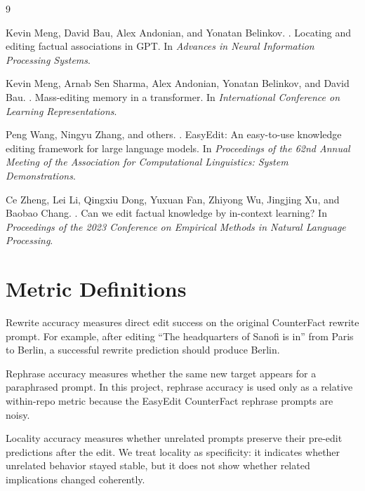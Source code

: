 \documentclass[11pt]{article}
\begin{document}
\begin{thebibliography}{9}

Kevin Meng, David Bau, Alex Andonian, and Yonatan Belinkov.
.
\newblock Locating and editing factual associations in GPT.
\newblock In \emph{Advances in Neural Information Processing Systems}.

Kevin Meng, Arnab Sen Sharma, Alex Andonian, Yonatan Belinkov, and David Bau.
.
\newblock Mass-editing memory in a transformer.
\newblock In \emph{International Conference on Learning Representations}.

Peng Wang, Ningyu Zhang, and others.
.
\newblock EasyEdit: An easy-to-use knowledge editing framework for large language models.
\newblock In \emph{Proceedings of the 62nd Annual Meeting of the Association for Computational Linguistics: System Demonstrations}.

Ce Zheng, Lei Li, Qingxiu Dong, Yuxuan Fan, Zhiyong Wu, Jingjing Xu, and Baobao Chang.
.
\newblock Can we edit factual knowledge by in-context learning?
\newblock In \emph{Proceedings of the 2023 Conference on Empirical Methods in Natural Language Processing}.

\end{thebibliography}

\appendix

\section{Metric Definitions}

Rewrite accuracy measures direct edit success on the original CounterFact rewrite prompt. For example, after editing ``The headquarters of Sanofi is in'' from Paris to Berlin, a successful rewrite prediction should produce Berlin.

Rephrase accuracy measures whether the same new target appears for a paraphrased prompt. In this project, rephrase accuracy is used only as a relative within-repo metric because the EasyEdit CounterFact rephrase prompts are noisy.

Locality accuracy measures whether unrelated prompts preserve their pre-edit predictions after the edit. We treat locality as specificity: it indicates whether unrelated behavior stayed stable, but it does not show whether related implications changed coherently.
\end{document}
